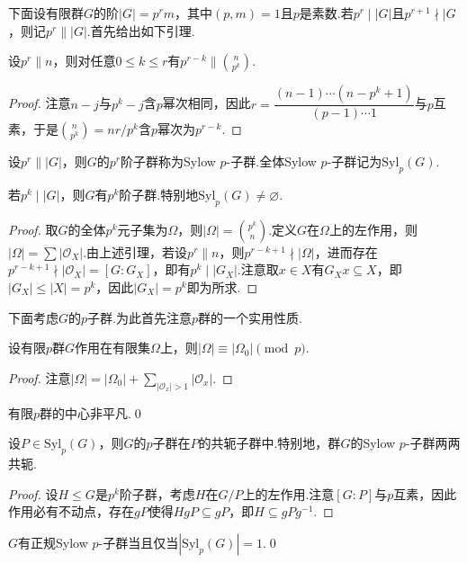 下面设有限群$G$的阶$|G|=p^rm$，其中$(p,m)=1$且$p$是素数.若$p^r\mid|G|$且$p^{r+1}\nmid|G$，则记$p^r\parallel|G|$.首先给出如下引理.
\begin{lemma}
	设$p^r\parallel n$，则对任意$0\le k\le r$有$p^{r-k}\parallel\displaystyle\binom{n}{p^k}$.
\end{lemma}
\begin{proof}
	注意$n-j$与$p^k-j$含$p$幂次相同，因此$r=\dfrac{(n-1)\cdots(n-p^k+1)}{(p-1)\cdots1}$与$p$互素，于是$\displaystyle\binom{n}{p^k}=nr/p^k$含$p$幂次为$p^{r-k}$.
\end{proof}

设$p^r\parallel |G|$，则$G$的$p^r$阶子群称为{\heiti Sylow $p$-子群}.全体Sylow $p$-子群记为$\mathrm{Syl}_p(G)$.
\begin{thm}[(Sylow第一定理)]
	若$p^k\mid|G|$，则$G$有$p^k$阶子群.特别地$\mathrm{Syl}_p(G)\ne\varnothing$.
\end{thm}
\begin{proof}
	取$G$的全体$p^k$元子集为$\Omega$，则$|\Omega|=\displaystyle\binom{p^k}{n}$.定义$G$在$\Omega$上的左作用，则$|\Omega|=\sum|\mathcal{O}_X|$.由上述引理，若设$p^r\parallel n$，则$p^{r-k+1}\nmid|\Omega|$，进而存在$p^{r-k+1}\nmid|\mathcal{O}_X|=[G:G_X]$，即有$p^k\mid|G_X|$.注意取$x\in X$有$G_Xx\subseteq X$，即$|G_X|\le|X|=p^k$，因此$|G_X|=p^k$即为所求.
\end{proof}

下面考虑$G$的$p$子群.为此首先注意$p$群的一个实用性质.
\begin{prop}
	设有限$p$群$G$作用在有限集$\Omega$上，则$|\Omega|\equiv|\Omega_0|\pmod{p}$.
\end{prop}
\begin{proof}
	注意$|\Omega|=|\Omega_0|+\sum_{|\mathcal{O}_x|>1}|\mathcal{O}_x|$.
\end{proof}
\begin{cor*}
	有限$p$群的中心非平凡.\qed\hypertarget{cor:pGroupCenter}{}
\end{cor*}
\begin{thm}[(Sylow第二定理)]
	设$P\in\mathrm{Syl}_p(G)$，则$G$的$p$子群在$P$的共轭子群中.特别地，群$G$的Sylow $p$-子群两两共轭.
\end{thm}
\begin{proof}
	设$H\le G$是$p^k$阶子群，考虑$H$在$G/P$上的左作用.注意$[G:P]$与$p$互素，因此作用必有不动点，存在$gP$使得$HgP\subseteq gP$，即$H\subseteq gPg^{-1}$.
\end{proof}
\begin{cor*}
	$G$有正规Sylow $p$-子群当且仅当$|\mathrm{Syl}_p(G)|=1$.\qed
\end{cor*}

